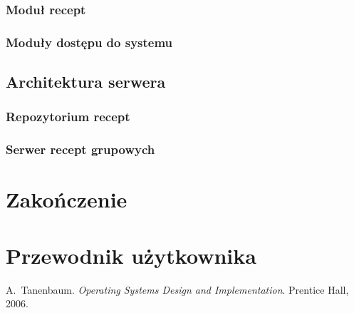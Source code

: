 \documentclass[11pt,a4paper,polish,thesis]{dcsbook}
\begin{document}
\subsection{Moduł recept}
\subsection{Moduły dostępu do systemu}

\section{Architektura serwera}
\subsection{Repozytorium recept}
\subsection{Serwer recept grupowych}

\chapter{Zakończenie}

\appendix

\chapter{Przewodnik użytkownika}

\backmatter

\begin{thebibliography}{1}
A.~Tanenbaum. \emph{Operating Systems Design and Implementation}. Prentice Hall, 2006.
\end{thebibliography}
\end{document}
